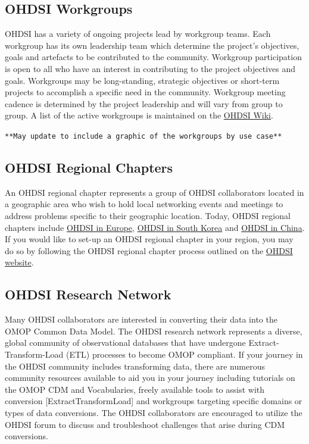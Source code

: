 \documentclass[11pt]{book}
\theoremstyle{definition}
\theoremstyle{definition}
\theoremstyle{definition}
\theoremstyle{remark}
\begin{document}
\hypertarget{ohdsi-workgroups}{%
\subsection{OHDSI Workgroups}\label{ohdsi-workgroups}}

OHDSI has a variety of ongoing projects lead by workgroup teams. Each workgroup has its own leadership team which determine the project's objectives, goals and artefacts to be contributed to the community. Workgroup participation is open to all who have an interest in contributing to the project objectives and goals. Workgroups may be long-standing, strategic objectives or short-term projects to accomplish a specific need in the community. Workgroup meeting cadence is determined by the project leadership and will vary from group to group. A list of the active workgroups is maintained on the \href{https://www.ohdsi.org/web/wiki/doku.php?id=projects:overview}{OHDSI Wiki}. 

\texttt{**May\ update\ to\ include\ a\ graphic\ of\ the\ workgroups\ by\ use\ case**}

\hypertarget{ohdsi-regional-chapters}{%
\subsection{OHDSI Regional Chapters}\label{ohdsi-regional-chapters}}

An OHDSI regional chapter represents a group of OHDSI collaborators located in a geographic area who wish to hold local networking events and meetings to address problems specific to their geographic location. Today, OHDSI regional chapters include \href{https://www.ohdsi-europe.org/}{OHDSI in Europe}, \href{http://forums.ohdsi.org/c/For-collaborators-wishing-to-communicate-in-Korean}{OHDSI in South Korea} and \href{https://ohdsichina.org/}{OHDSI in China}. If you would like to set-up an OHDSI regional chapter in your region, you may do so by following the OHDSI regional chapter process outlined on the \href{https://www.ohdsi.org/who-we-are/regional-chapters}{OHDSI website}. 

\hypertarget{ohdsi-research-network}{%
\subsection{OHDSI Research Network}\label{ohdsi-research-network}}

Many OHDSI collaborators are interested in converting their data into the OMOP Common Data Model. The OHDSI research network represents a diverse, global community of observational databases that have undergone Extract-Transform-Load (ETL) processes to become OMOP compliant. If your journey in the OHDSI community includes transforming data, there are numerous community resources available to aid you in your journey including tutorials on the OMOP CDM and Vocabularies, freely available tools to assist with conversion {[}ExtractTransformLoad{]} and workgroups targeting specific domains or types of data conversions. The OHDSI collaborators are encouraged to utilize the OHDSI forum to discuss and troubleshoot challenges that arise during CDM conversions.
\end{document}
